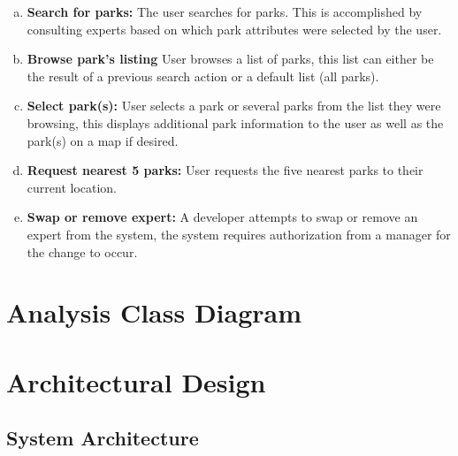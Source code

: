 \documentclass[titlepage,12pt]{article}
\begin{document}
\begin{enumerate}[a)]
    \item \textbf{Search for parks:} The user searches for parks. This is accomplished by consulting
    experts based on which park attributes were selected by the user.
    \item \textbf{Browse park's listing} User browses a list of parks, this list can either be the
    result of a previous search action or a default list (all parks).
    \item \textbf{Select park(s):} User selects a park or several parks from the list they were
    browsing, this displays additional park information to the user as well as the park(s) on a map
    if desired.
    \item \textbf{Request nearest 5 parks:} User requests the five nearest parks to their current
    location.
    \item \textbf{Swap or remove expert:} A developer attempts to swap or remove an expert from the
    system, the system requires authorization from a manager for the change to occur.
\end{enumerate}


\section{Analysis Class Diagram}
\label{sec:analysis_class_diagram}



\section{Architectural Design}
\label{sec:architectural_design}


\subsection{System Architecture}
\label{sub:system_architecture}

\end{document}
